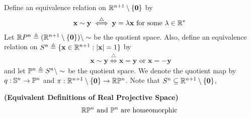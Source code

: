 \documentclass{report}
\begin{document}
\begin{mdframed}
Define an equivalence relation on $\R^{n+1}\setminus \set{\textbf{0}}$ by 
\begin{align*}
\textbf{x}\sim \textbf{y}\overset{\triangle}{\iff }\textbf{y}=\ld \textbf{x}\text{ for some $\ld \inr^*$ } 
\end{align*}
Let $\RP ^n\triangleq (\R^{n+1}\setminus \set{\textbf{0}})\setminus \sim $ be the quotient space. Also, define an equivalence relation on $S^n\triangleq \set{\textbf{x}\inr^{n+1}:\abso{\textbf{x}}=1}$ by 
\begin{align*}
\textbf{x}\sim \textbf{y}\overset{\triangle}{\iff } \textbf{x}=\textbf{y}\text{ or }\textbf{x}=-\textbf{y}
\end{align*}
and let $\P^n\triangleq S^n\setminus \sim $ be the quotient space. We denote the quotient map by $q:\S^n\rightarrow \P^n$ and $\pi:\R^{n+1}\setminus \set{\textbf{0}}\rightarrow \R\P^n$. Note that $S^n\subseteq \R^{n+1}\setminus \set{\textbf{0}}$, 
\end{mdframed}
\begin{theorem}
\label{RPnhom}
\textbf{(Equivalent Definitions of Real Projective Space)} 
\begin{align*}
\R\P^n\text{ and }\P^n\text{ are homeomorphic }
\end{align*}
\end{theorem}
\end{document}
